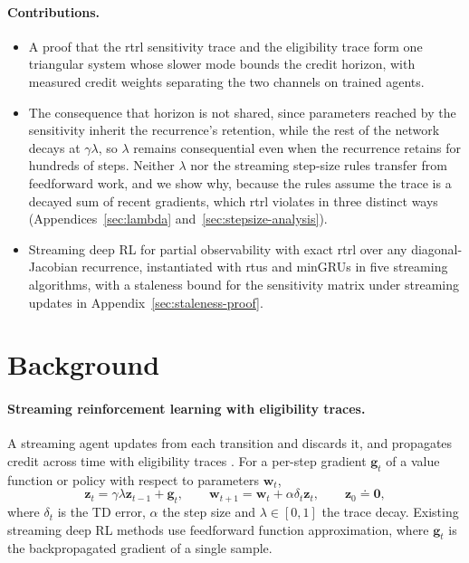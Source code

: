 \documentclass{article}
\begin{document}
\paragraph{Contributions.}
\begin{itemize}
    \item A proof that the \gls{rtrl} sensitivity trace and the eligibility trace form one
    triangular system whose slower mode bounds the credit horizon, with measured credit weights
    separating the two channels on trained agents.
    \item The consequence that horizon is not shared, since parameters reached by the sensitivity
    inherit the recurrence's retention, while the rest of the network decays at
    $\gamma\lambda$, so $\lambda$ remains consequential even when the recurrence retains for
    hundreds of steps. Neither $\lambda$ nor the streaming step-size rules transfer from
    feedforward work, and we show why, because the rules assume the trace is a decayed sum of recent
    gradients, which \gls{rtrl} violates in three distinct ways
    (Appendices~\ref{sec:lambda} and~\ref{sec:stepsize-analysis}).
    \item Streaming deep RL for partial observability with exact \gls{rtrl} over any
    diagonal-Jacobian recurrence, instantiated with \gls{rtu}s and minGRUs in five streaming
    algorithms, with a staleness bound for the sensitivity matrix under streaming updates in
    Appendix~\ref{sec:staleness-proof}.
\end{itemize}

\section{Background}
\label{sec:background}

\paragraph{Streaming reinforcement learning with eligibility traces.}
A streaming agent updates from each transition and discards it, and propagates credit across time with eligibility traces \citep{sutton1998introduction}. For a per-step gradient $\boldsymbol{g}_t$ of a value function or policy with respect to parameters $\boldsymbol{w}_t$,
\begin{equation}
    \boldsymbol{z}_t = \gamma\lambda \boldsymbol{z}_{t-1} + \boldsymbol{g}_t, \qquad \boldsymbol{w}_{t+1} = \boldsymbol{w}_t + \alpha \delta_t \boldsymbol{z}_t, \qquad \boldsymbol{z}_0 \doteq \boldsymbol{0},
\end{equation}
where $\delta_t$ is the TD error, $\alpha$ the step size and $\lambda \in [0,1]$ the trace decay. Existing streaming deep RL methods \citep{elsayed2024streaming, vasan2024deep} use feedforward function approximation, where $\boldsymbol{g}_t$ is the backpropagated gradient of a single sample.
\end{document}
